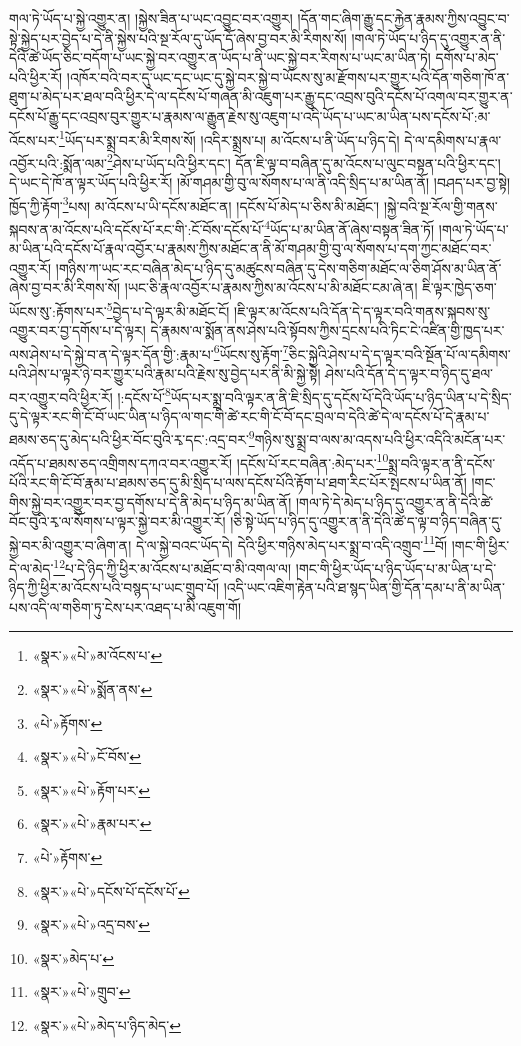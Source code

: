 གལ་ཏེ་ཡོད་པ་སྐྱེ་འགྱུར་ན། །སྐྱེས་ཟིན་པ་ཡང་འབྱུང་བར་འགྱུར། །དོན་གང་ཞིག་རྒྱུ་དང་རྐྱེན་རྣམས་ཀྱིས་འབྱུང་བ་སྟེ་སྐྱེད་པར་བྱེད་པ་དེ་ནི་སྐྱེས་པའི་སྔ་རོལ་དུ་ཡོད་དོ་ཞེས་བྱ་བར་མི་རིགས་སོ། །གལ་ཏེ་ཡོད་པ་ཉིད་དུ་འགྱུར་ན་ནི་དེའི་ཚེ་ཡོད་ཅིང་བདོག་པ་ཡང་སྐྱེ་བར་འགྱུར་ན་ཡོད་པ་ནི་ཡང་སྐྱེ་བར་རིགས་པ་ཡང་མ་ཡིན་ཏེ། དགོས་པ་མེད་པའི་ཕྱིར་རོ། །འཁོར་བའི་བར་དུ་ཡང་དང་ཡང་དུ་སྐྱེ་བར་སྐྱེ་བ་ཡོངས་སུ་མ་རྫོགས་པར་གྱུར་པའི་དོན་གཅིག་ཁོ་ན་ཐུག་པ་མེད་པར་ཐལ་བའི་ཕྱིར་དེ་ལ་དངོས་པོ་གཞན་མི་འཇུག་པར་རྒྱུ་དང་འབྲས་བུའི་དངོས་པོ་འགལ་བར་གྱུར་ན་དངོས་པོ་རྒྱུ་དང་འབྲས་བུར་གྱུར་པ་རྣམས་ལ་རྒྱུན་རྗེས་སུ་འཇུག་པ་འདི་ཡོད་པ་ཡང་མ་ཡིན་པས་དངོས་པོ་:མ་འོངས་པར་\footnote{«སྣར་»«པེ་»མ་འོངས་པ་}ཡོད་པར་སྨྲ་བར་མི་རིགས་སོ། །འདིར་སྨྲས་པ། མ་འོངས་པ་ནི་ཡོད་པ་ཉིད་དེ། དེ་ལ་དམིགས་པ་རྣལ་འབྱོར་པའི་:སྨོན་ལམ་\footnote{«སྣར་»«པེ་»སྨོན་ནས་}ཤེས་པ་ཡོད་པའི་ཕྱིར་དང་། དོན་ཇི་ལྟ་བ་བཞིན་དུ་མ་འོངས་པ་ལུང་བསྟན་པའི་ཕྱིར་དང་། དེ་ཡང་དེ་ཁོ་ན་ལྟར་ཡོད་པའི་ཕྱིར་རོ། །མོ་གཤམ་གྱི་བུ་ལ་སོགས་པ་ལ་ནི་འདི་སྲིད་པ་མ་ཡིན་ནོ། །བཤད་པར་བྱ་སྟེ། ཁྱོད་ཀྱི་རྟོག་\footnote{«པེ་»རྟོགས་}པས། མ་འོངས་པ་ཡི་དངོས་མཐོང་ན། །དངོས་པོ་མེད་པ་ཅིས་མི་མཐོང་། །སྐྱེ་བའི་སྔ་རོལ་གྱི་གནས་སྐབས་ན་མ་འོངས་པའི་དངོས་པོ་རང་གི་:ངོ་བོས་དངོས་པོ་\footnote{«སྣར་»«པེ་»ངོ་བོས་}ཡོད་པ་མ་ཡིན་ནོ་ཞེས་བསྟན་ཟིན་ཏོ། །གལ་ཏེ་ཡོད་པ་མ་ཡིན་པའི་དངོས་པོ་རྣལ་འབྱོར་པ་རྣམས་ཀྱིས་མཐོང་ན་ནི་མོ་གཤམ་གྱི་བུ་ལ་སོགས་པ་དག་ཀྱང་མཐོང་བར་འགྱུར་རོ། །གཉིས་ཀ་ཡང་རང་བཞིན་མེད་པ་ཉིད་དུ་མཚུངས་བཞིན་དུ་དེས་གཅིག་མཐོང་ལ་ཅིག་ཤོས་མ་ཡིན་ནོ་ཞེས་བྱ་བར་མི་རིགས་སོ། །ཡང་ཅི་རྣལ་འབྱོར་པ་རྣམས་ཀྱིས་མ་འོངས་པ་མི་མཐོང་ངམ་ཞེ་ན། ཇི་ལྟར་ཁྱེད་ཅག་ཡོངས་སུ་:རྟོགས་པར་\footnote{«སྣར་»«པེ་»རྟོག་པར་}བྱེད་པ་དེ་ལྟར་མི་མཐོང་ངོ། །ཇི་ལྟར་མ་འོངས་པའི་དོན་དེ་ད་ལྟར་བའི་གནས་སྐབས་སུ་འགྱུར་བར་བྱ་དགོས་པ་དེ་ལྟར། དེ་རྣམས་ལ་སྨོན་ནས་ཤེས་པའི་སྟོབས་ཀྱིས་དྲངས་པའི་ཏིང་ངེ་འཛིན་གྱི་ཁྱད་པར་ལས་ཤེས་པ་དེ་སྐྱེ་བ་ན་དེ་ལྟར་དོན་གྱི་:རྣམ་པ་\footnote{«སྣར་»«པེ་»རྣམ་པར་}ཡོངས་སུ་རྟོག་\footnote{«པེ་»རྟོགས་}ཅིང་སྐྱེའི་ཤེས་པ་དེ་ད་ལྟར་བའི་སྔོན་པོ་ལ་དམིགས་པའི་ཤེས་པ་ལྟར་ཉེ་བར་གྱུར་པའི་རྣམ་པའི་རྗེས་སུ་བྱེད་པར་ནི་མི་སྐྱེ་སྟེ། ཤེས་པའི་དོན་དེ་ད་ལྟར་བ་ཉིད་དུ་ཐལ་བར་འགྱུར་བའི་ཕྱིར་རོ། །:དངོས་པོ་\footnote{«སྣར་»«པེ་»དངོས་པོ་དངོས་པོ་}ཡོད་པར་སྨྲ་བའི་ལྟར་ན་ནི་ཇི་སྲིད་དུ་དངོས་པོ་དེའི་ཡོད་པ་ཉིད་ཡིན་པ་དེ་སྲིད་དུ་དེ་ལྟར་རང་གི་ངོ་བོ་ཡང་ཡིན་པ་ཉིད་ལ་གང་གི་ཚེ་རང་གི་ངོ་བོ་དང་བྲལ་བ་དེའི་ཚེ་དེ་ལ་དངོས་པོ་དེ་རྣམ་པ་ཐམས་ཅད་དུ་མེད་པའི་ཕྱིར་བོང་བུའི་རྭ་དང་:འདྲ་བར་\footnote{«སྣར་»«པེ་»འདྲ་བས་}གཉིས་སུ་སྨྲ་བ་ལས་མ་འདས་པའི་ཕྱིར་འདིའི་མངོན་པར་འདོད་པ་ཐམས་ཅད་འགྲིགས་དཀའ་བར་འགྱུར་རོ། །དངོས་པོ་རང་བཞིན་:མེད་པར་\footnote{«སྣར་»མེད་པ་}སྨྲ་བའི་ལྟར་ན་ནི་དངོས་པོའི་རང་གི་ངོ་བོ་རྣམ་པ་ཐམས་ཅད་དུ་མི་སྲིད་པ་ལས་དངོས་པོའི་རྟོག་པ་ཐག་རིང་པོར་སྤངས་པ་ཡིན་ནོ། །གང་གིས་སྐྱེ་བར་འགྱུར་བར་བྱ་དགོས་པ་དེ་ནི་མེད་པ་ཉིད་མ་ཡིན་ནོ། །གལ་ཏེ་དེ་མེད་པ་ཉིད་དུ་འགྱུར་ན་ནི་དེའི་ཚེ་བོང་བུའི་རྭ་ལ་སོགས་པ་ལྟར་སྐྱེ་བར་མི་འགྱུར་རོ། །ཅི་སྟེ་ཡོད་པ་ཉིད་དུ་འགྱུར་ན་ནི་དེའི་ཚེ་ད་ལྟ་བ་ཉིད་བཞིན་དུ་སྐྱེ་བར་མི་འགྱུར་བ་ཞིག་ན། དེ་ལ་སྐྱེ་བའང་ཡོད་དེ། དེའི་ཕྱིར་གཉིས་མེད་པར་སྨྲ་བ་འདི་འགྲུབ་\footnote{«སྣར་»«པེ་»གྲུབ་}བོ། །གང་གི་ཕྱིར་དེ་ལ་མེད་\footnote{«སྣར་»«པེ་»མེད་པ་ཉིད་མེད་}པ་དེ་ཉིད་ཀྱི་ཕྱིར་མ་འོངས་པ་མཐོང་བ་མི་འགལ་ལ། །གང་གི་ཕྱིར་ཡོད་པ་ཉིད་ཡོད་པ་མ་ཡིན་པ་དེ་ཉིད་ཀྱི་ཕྱིར་མ་འོངས་པའི་བསྙད་པ་ཡང་གྲུབ་པོ། །འདི་ཡང་འཇིག་རྟེན་པའི་ཐ་སྙད་ཡིན་གྱི་དོན་དམ་པ་ནི་མ་ཡིན་པས་འདི་ལ་གཅིག་ཏུ་ངེས་པར་འཐད་པ་མི་འཇུག་གོ། 